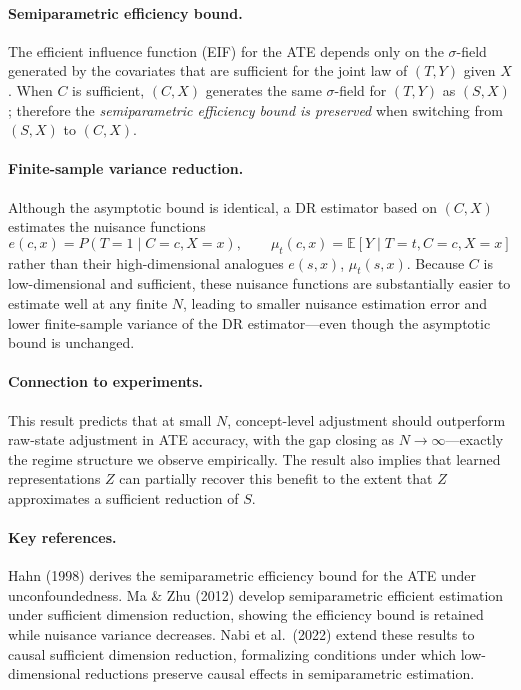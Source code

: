 \documentclass[11pt]{article}
\begin{document}
\paragraph{Semiparametric efficiency bound.} The efficient influence function (EIF)
for the ATE depends only on the $\sigma$-field generated by the covariates that are
sufficient for the joint law of $(T, Y)$ given $X$.\cite{hahn1998role} When $C$ is
sufficient, $(C, X)$ generates the same $\sigma$-field for $(T, Y)$ as $(S, X)$;
therefore the \emph{semiparametric efficiency bound is preserved} when switching
from $(S, X)$ to $(C, X)$.

\paragraph{Finite-sample variance reduction.} Although the asymptotic bound is
identical, a DR estimator based on $(C, X)$ estimates the nuisance functions
\[
e(c,x) = P(T{=}1 \mid C{=}c, X{=}x), \qquad
\mu_t(c,x) = \mathbb{E}[Y \mid T{=}t, C{=}c, X{=}x]
\]
rather than their high-dimensional analogues $e(s,x)$, $\mu_t(s,x)$. Because $C$
is low-dimensional and sufficient, these nuisance functions are substantially easier
to estimate well at any finite $N$, leading to smaller nuisance estimation error and
lower finite-sample variance of the DR estimator---even though the asymptotic bound
is unchanged.\cite{ma2012semiparametric,nabi2022causal}

\paragraph{Connection to experiments.} This result predicts that at small $N$,
concept-level adjustment should outperform raw-state adjustment in ATE accuracy,
with the gap closing as $N \to \infty$---exactly the regime structure we observe
empirically. The result also implies that learned representations $Z$ can partially
recover this benefit to the extent that $Z$ approximates a sufficient reduction of
$S$.

\paragraph{Key references.} Hahn (1998)\cite{hahn1998role} derives the
semiparametric efficiency bound for the ATE under unconfoundedness. Ma \&
Zhu (2012)\cite{ma2012semiparametric} develop semiparametric efficient estimation
under sufficient dimension reduction, showing the efficiency bound is retained while
nuisance variance decreases. Nabi et al.\ (2022)\cite{nabi2022causal} extend these
results to causal sufficient dimension reduction, formalizing conditions under which
low-dimensional reductions preserve causal effects in semiparametric estimation.
\end{document}
